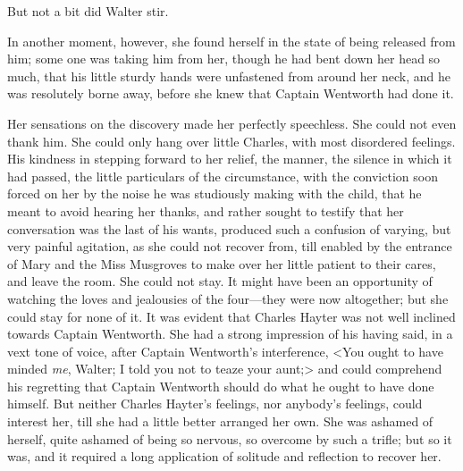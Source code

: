 But not a bit did Walter stir.

In another moment, however, she found herself in the state of being released from him; some one was taking him from her, though he had bent down her head so much, that his little sturdy hands were unfastened from around her neck, and he was resolutely borne away, before she knew that Captain Wentworth had done it.

Her sensations on the discovery made her perfectly speechless. She could not even thank him. She could only hang over little Charles, with most disordered feelings. His kindness in stepping forward to her relief, the manner, the silence in which it had passed, the little particulars of the circumstance, with the conviction soon forced on her by the noise he was studiously making with the child, that he meant to avoid hearing her thanks, and rather sought to testify that her conversation was the last of his wants, produced such a confusion of varying, but very painful agitation, as she could not recover from, till enabled by the entrance of Mary and the Miss Musgroves to make over her little patient to their cares, and leave the room. She could not stay. It might have been an opportunity of watching the loves and jealousies of the four—they were now altogether; but she could stay for none of it. It was evident that Charles Hayter was not well inclined towards Captain Wentworth. She had a strong impression of his having said, in a vext tone of voice, after Captain Wentworth's interference, <You ought to have minded \textit{me}, Walter; I told you not to teaze your aunt;> and could comprehend his regretting that Captain Wentworth should do what he ought to have done himself. But neither Charles Hayter's feelings, nor anybody's feelings, could interest her, till she had a little better arranged her own. She was ashamed of herself, quite ashamed of being so nervous, so overcome by such a trifle; but so it was, and it required a long application of solitude and reflection to recover her.